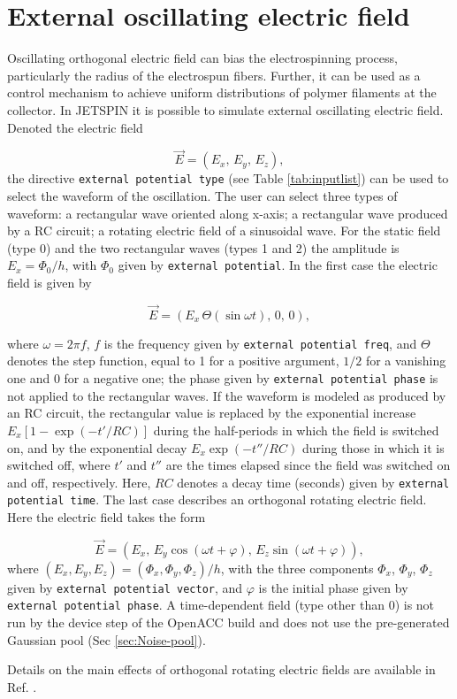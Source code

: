 \section{External oscillating electric field\label{sec:External-oscillating-electric-field}}

Oscillating orthogonal electric field can bias the electrospinning
process, particularly the radius of the electrospun fibers. Further,
it can be used as a control mechanism to achieve uniform distributions
of polymer filaments at the collector. In JETSPIN it is possible to
simulate external oscillating electric field. Denoted the electric
field

\begin{equation}
\vec{E}=\left(E_{x},\,E_{y},\,E_{z}\right),
\end{equation}
the directive \texttt{external potential type} (see Table \ref{tab:inputlist})
can be used to select the waveform of the oscillation. The user can
select three types of waveform: a rectangular wave oriented along
x-axis; a rectangular wave produced by a RC circuit; a rotating electric
field of a sinusoidal wave. For the static field (type 0) and the
two rectangular waves (types 1 and 2) the amplitude is $E_{x}=\Phi_{0}/h$,
with $\Phi_{0}$ given by \texttt{external potential}. In the first case the electric field is
given by

\begin{equation}
\vec{E}=\left(E_{x}\,\Theta\left(\sin\omega t\right),\,0,\,0\right),
\end{equation}

where $\omega=2\pi f$, $f$ is the frequency given by \texttt{external potential freq},
and $\Theta$ denotes the step function, equal to 1 for a positive
argument, $1/2$ for a vanishing one and 0 for a negative one; the
phase given by \texttt{external potential phase} is not applied to
the rectangular waves. If the waveform is modeled as produced by an RC circuit,
the rectangular value is replaced by
the exponential increase $E_{x}\left[1-\exp\left(-t'/RC\right)\right]$
during the half-periods in which the field is switched on, and by the
exponential decay $E_{x}\exp\left(-t''/RC\right)$ during those in which
it is switched off, where $t'$ and $t''$ are the times elapsed since the
field was switched on and off, respectively. Here, $RC$ denotes a
decay time (seconds) given by \texttt{external potential time}. The last case describes an orthogonal rotating
electric field. Here the electric field takes the form

\begin{equation}
\vec{E}=\left(E_{x},\,E_{y}\cos\left(\omega t+\varphi\right),\,E_{z}\sin\left(\omega t+\varphi\right)\right),
\end{equation}
where $\left(E_{x},E_{y},E_{z}\right)=\left(\Phi_{x},\Phi_{y},\Phi_{z}\right)/h$,
with the three components $\Phi_{x}$, $\Phi_{y}$, $\Phi_{z}$ given by
\texttt{external potential vector}, and $\varphi$ is the initial phase
given by \texttt{external potential phase}. A time-dependent field
(type other than 0) is not run by the device step of the OpenACC build
and does not use the pre-generated Gaussian pool (Sec \ref{sec:Noise-pool}).

Details on the main effects of orthogonal rotating electric fields
are available in Ref. \cite{lauricella2017effects}.

